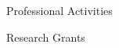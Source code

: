 \documentclass[a4paper]{article}
\begin{document}




{\sc\Large Professional Activities} \\



\bigskip

{\sc\Large Research Grants} \\


\end{document}
